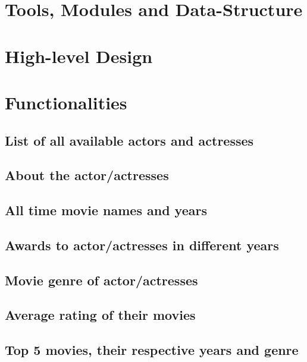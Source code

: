 \documentclass[12pt]{article}
\begin{document}
\section{Tools, Modules and Data-Structure}

\section{High-level Design}

\section{Functionalities}
\subsection{List of all available actors and actresses}

\subsection{About the actor/actresses}

\subsection{All time movie names and years}

\subsection{Awards to actor/actresses in different years}

\subsection{Movie genre of actor/actresses}

\subsection{Average rating of their movies}

\subsection{Top 5 movies, their respective years and genre}
\end{document}
